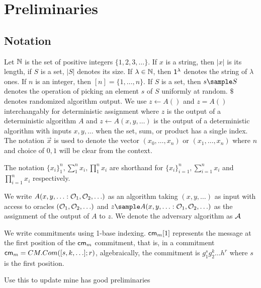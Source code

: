 % 
% 



\section{Preliminaries}\label{sec:preliminaries}
\subsection{Notation}
Let $\mathbb{N}$ is the set of positive integers $\{1,2,3,\ldots\}$. If $x$ is a string, then $|x|$ is its length, if $S$ is a set, $|S|$ denotes its size. If $\lambda \in \mathbb{N}$, then $\mathsf{1^{\lambda}}$ denotes the string of $\lambda$ ones. If $n$ is an integer, then $[n] = \{1, \ldots,n\}.$ If $S$ is a set, then $s \sample S$ denotes the operation of picking an element $s$ of $S$ uniformly at random. $\$$ denotes randomized algorithm output. We use $z \gets A()$ and $z = A()$ interchangably for deterministic assignment where $z$ is the output of a deterministic algorithm $A$ and $z \gets A(x,y,\ldots)$ is the output of a deterministic algorithm with inputs $x,y,\ldots$ when the set, sum, or product has a single index. 
The notation $\vec{x}$ is used to denote the vector $(x_0, \ldots,x_n)$ or $(x_1, \ldots, x_n)$ where $n$ and choice of $0, 1$ will be clear from the context.

The notation $\{x_i\}_1^n, \sum_1^n x_i, \prod_1^n x_i$ are shorthand for $\{x_i\}_{i=1}^n, \sum_{i=1}^n x_i$ and $\prod_{i=1}^n x_i$ respectively. 

We write $A(x,y,\ldots : \mathcal{O}_1, \mathcal{O}_2, \ldots)$ as an algorithm taking $(x,y,\ldots)$ as input with access to oracles $(\mathcal{O}_1, \mathcal{O}_2, \ldots)$ and $z \sample A(x,y,\ldots : \oracle_1, \oracle_2, \ldots)$ as the assignment of the output of $A$ to $z$. We denote the adversary algorithm as $\mathcal{A}$

We write commitments using 1-base indexing. $\mathsf{cm}_m[1]$ represents the message at the first position of the $\mathsf{cm}_m$ commitment, that is, in a commitment $\mathsf{cm}_m = CM.Com([s,k,\ldots];r)$, algebraically, the commitment is $g_1^sg_2^k\ldots h^r$ where $s$ is the first position.


Use this to update mine
\cite{hutchison_get_2010} has good preliminaries

